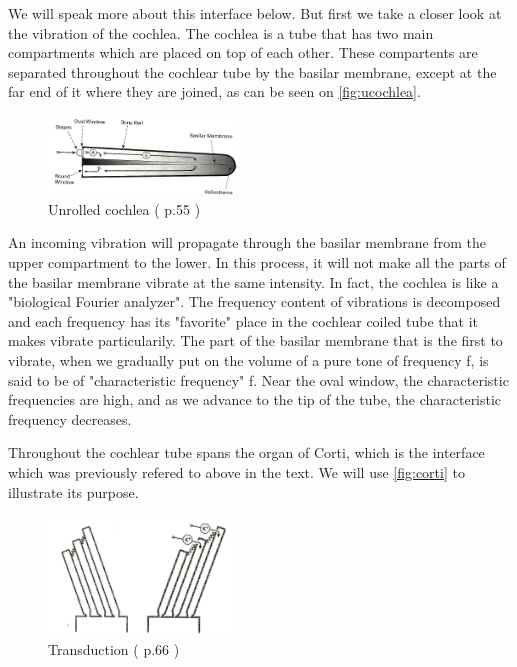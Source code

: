 We will speak more about this interface below. But first we take a closer 
look at the vibration of the cochlea. 
The cochlea is a tube that has two main compartments which are placed on top of 
each other. 
These compartents are separated throughout the cochlear tube by  
the basilar membrane, except at the far end of it where they are joined, 
as can be seen on \autoref{fig:ucochlea}.


\begin{figure}[h]
	\centering
	\includegraphics[width=0.45\textwidth]{images/cochlea-aud55-level.jpg}
	\caption{Unrolled cochlea (\cite{AuditoryNeuroscience} p.55 )}
	\label{fig:ucochlea}
\end{figure}


An incoming vibration will propagate through the basilar membrane from 
the upper compartment to the lower. In this process, it will not make all 
the parts of the basilar membrane vibrate at the same intensity. 
In fact, the cochlea is like a "biological Fourier analyzer".
The frequency content of vibrations is decomposed and each frequency has its 
"favorite" place in the cochlear coiled tube that it makes vibrate particularily. 
The part of the basilar membrane that is the first to vibrate, 
when we gradually put on the volume of a pure tone of frequency f, is said to be of 
"characteristic frequency" f. Near the oval window, the characteristic 
frequencies are high, and as we advance to the tip of the tube, 
the characteristic frequency decreases.

Throughout the cochlear tube spans the organ of Corti, which is the interface
which was previously refered to above in the text. 
We will use \autoref{fig:corti} to illustrate its purpose.


\begin{figure}[h]
	\centering
  \includegraphics[width=0.45\textwidth]{images/hctransd-aud66-level.jpg}
	\caption{Transduction (\cite{AuditoryNeuroscience} p.66 )}
	\label{fig:transd}
\end{figure}

